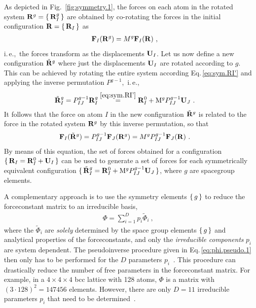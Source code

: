 As depicted in Fig.~\ref{fig:symmetry.1}, the forces on each atom in the rotated system ${\bf R}^g = \set{{\bf R}^g_I}$ are obtained by co-rotating the forces in the initial configuration ${\bf R} = \set{{\bf R}_I}$ as
\begin{align}
	\b F_I (\b R^g) &= {M}^g \b F_I (\b R)~,
	\label{eq:sym.Fp}
\end{align}
i.\,e.,~the forces transform as the displacements ${\bf U}_I$. Let us now define a new configuration $\tilde{{\bf R}}^g$ where just the displacements ${\bf U}_I$ are rotated according to $g$. This can be achieved by rotating the entire system according Eq.\,\eqref{eq:sym.RI'} and applying the inverse permutation $P^{g-1}$,~i.\,e.,
\begin{align}
	\tilde{{\bf R}}_I^g 
		&= P^{g-1}_{IJ} {\bf R}_I^g 
		\stackrel{\eqref{eq:sym.RI'}}{=} {\bf R}^0_I + {\rm M}^g P^{g-1}_{IJ} {\bf U}_J~.
\end{align}
It follows that the force on atom $I$ in the new configuration $\tilde{{\bf R}}^g$ is related to the force in the rotated system ${\bf R}^g$ by this inverse permutation, so that
\begin{align}
		\b F_I (\tilde{\b R}^g) 
			&= {P}^{g-1}_{IJ} \b F_J (\b R^g) 
			= {M}^g  {P}^{g-1}_{IJ} \b F_J (\b R)~.
		\label{eq:sym.Ftilde}
\end{align}
By means of this equation, the set of forces obtained for a configuration $\set{{\bf R}_I = {\bf R}_I^0 + {\bf U}_I}$ can be used to generate a set of forces for each symmetrically equivalent configuration $\set{\tilde{{\bf R}}_I^g = {\bf R}_I^0 + {\rm M}^g P^{g-1}_{IJ} {\bf U}_J}$, where $g$ are spacegroup elements.

A complementary approach is to use the symmetry elements $\set{g}$ to reduce the forceconstant matrix to an irreducible basis,
\begin{align}
	\Phi 
		= \sum_{i=1}^{D} p_i \tilde{\Phi}_i~,
	\label{eq:sym.Phi.irrep.1}
\end{align}
where the $\tilde{\Phi}_i$ are \emph{solely} determined by the space group elements $\set{g}$ and analytical properties of the forceconstants, and only the \emph{irreducible components} $p_i$ are system dependent. The pseudoinverse procedure given in Eq.\,\eqref{eq:phi.pseudo.1} then only has to be performed for the $D$ parameters $p_i$~\cite{Parlinski1997}. This procedure can drastically reduce the number of free parameters in the forceconstant matrix. For example, in a $4\times4\times4$ bcc lattice with 128 atoms, $\Phi$ is a matrix with $(3 \cdot 128)^2 = 147456$ elements. However, there are only $D=11$ irreducible parameters $p_i$ that need to be determined~\cite{Hellman2013}.

